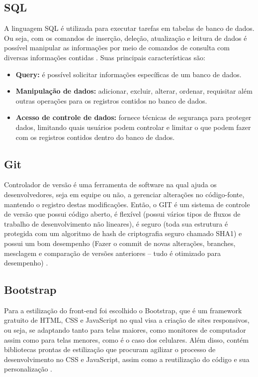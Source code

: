 \subsection{SQL}
A linguagem SQL é utilizada para executar tarefas em tabelas de banco de dados. Ou seja, com os comandos de inserção, deleção, atualização e leitura de dados é possível manipular as informações por meio de comandos de consulta com diversas informações contidas \cite{HEUSER}. Suas principais características são:
\begin{itemize}
    \item \textbf{Query:} é possível solicitar informações específicas de um banco de dados.
    \item \textbf{Manipulação de dados:} adicionar, excluir, alterar, ordenar, requisitar além outras operações para os registros contidos no banco de dados.
    \item \textbf{Acesso de controle de dados:} fornece técnicas de segurança para proteger dados, limitando quais usuários podem controlar e limitar o que podem fazer com os registros contidos dentro do banco de dados.
\end{itemize}
\subsection{Git}
Controlador de versão é uma ferramenta de software na qual ajuda os desenvolvedores, seja em equipe ou não, a gerenciar alterações no código-fonte, mantendo o registro destas modificações. Então, o GIT é um sistema de controle de versão que possui código aberto, é flexível (possui vários tipos de fluxos de trabalho de desenvolvimento não lineares), é seguro (toda sua estrutura é protegida com um algoritmo de hash de criptografia seguro chamado SHA1) e possui um bom desempenho (Fazer o commit de novas alterações, branches, mesclagem e comparação de versões anteriores – tudo é otimizado para desempenho) \cite{SANTACROCE}.

\subsection{Bootstrap}
Para a estilização do front-end foi escolhido o Bootstrap, que é um framework gratuito de HTML, CSS e JavaScript no qual visa a criação de sites responsivos, ou seja, se adaptando tanto para telas maiores, como monitores de computador assim como para telas menores, como é o caso dos celulares. Além disso, contém bibliotecas prontas de estilização que procuram agilizar o processo de desenvolvimento no CSS e JavaScript, assim como a reutilização do código e sua personalização \cite{SPURLOCK}.

